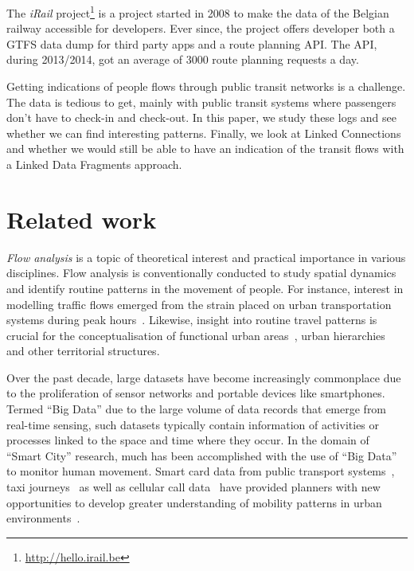 \documentclass{sig-alternate}
\begin{document}

The \emph{iRail} project\footnote{\url{http://hello.irail.be}} is a project started in 2008 to make the data of the Belgian railway accessible for developers.
Ever since, the project offers developer both a GTFS data dump for third party apps and a route planning API.
The API, during 2013/2014, got an average of 3000 route planning requests a day.

Getting indications of people flows through public transit networks is a challenge.
The data is tedious to get, mainly with public transit systems where passengers don't have to check-in and check-out.
In this paper, we study these logs and see whether we can find interesting patterns.
Finally, we look at Linked Connections~\cite{lc} and whether we would still be able to have an indication of the transit flows with a Linked Data Fragments approach.

\section{Related work}
\label{sec:relwork}

\emph{Flow analysis} is a topic of theoretical interest and practical importance in various disciplines. 
Flow analysis is conventionally conducted to study spatial dynamics and identify routine patterns in the movement of people.
For instance, interest in modelling traffic flows emerged from the strain placed on urban transportation systems during peak hours~\cite{roth,ferreira}.
Likewise, insight into routine travel patterns is crucial for the conceptualisation of functional urban areas~\cite{servillo,sykora}, urban hierarchies~\cite{christaller} and other territorial structures.

Over the past decade, large datasets have become increasingly commonplace due to the proliferation of sensor networks and portable devices like smartphones.
Termed ``Big Data'' due to the large volume of data records that emerge from real-time sensing\cite{kitchin}, such datasets typically contain information of activities or processes linked to the space and time where they occur.
In the domain of ``Smart City'' research, much has been accomplished with the use of ``Big Data'' to monitor human movement.
Smart card data from public transport systems~\cite{roth,beecham}, taxi journeys~\cite{ferreira} as well as cellular call data~\cite{sevtsuk} have provided planners with new opportunities to develop greater understanding of mobility patterns in urban environments~\cite{batty}.
\end{document}
